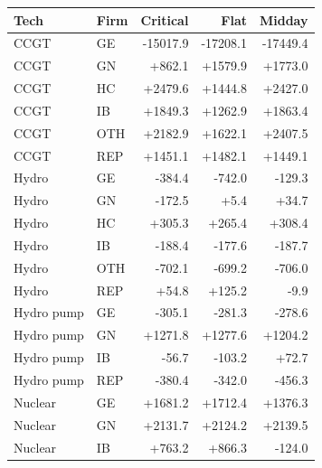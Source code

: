 \begin{tabular}{l l r r r}
\toprule
Tech & Firm & Critical & Flat & Midday \\
\midrule
CCGT & GE & -15017.9 & -17208.1 & -17449.4 \\
CCGT & GN & +862.1 & +1579.9 & +1773.0 \\
CCGT & HC & +2479.6 & +1444.8 & +2427.0 \\
CCGT & IB & +1849.3 & +1262.9 & +1863.4 \\
CCGT & OTH & +2182.9 & +1622.1 & +2407.5 \\
CCGT & REP & +1451.1 & +1482.1 & +1449.1 \\
Hydro & GE & -384.4 & -742.0 & -129.3 \\
Hydro & GN & -172.5 & +5.4 & +34.7 \\
Hydro & HC & +305.3 & +265.4 & +308.4 \\
Hydro & IB & -188.4 & -177.6 & -187.7 \\
Hydro & OTH & -702.1 & -699.2 & -706.0 \\
Hydro & REP & +54.8 & +125.2 & -9.9 \\
Hydro pump & GE & -305.1 & -281.3 & -278.6 \\
Hydro pump & GN & +1271.8 & +1277.6 & +1204.2 \\
Hydro pump & IB & -56.7 & -103.2 & +72.7 \\
Hydro pump & REP & -380.4 & -342.0 & -456.3 \\
Nuclear & GE & +1681.2 & +1712.4 & +1376.3 \\
Nuclear & GN & +2131.7 & +2124.2 & +2139.5 \\
Nuclear & IB & +763.2 & +866.3 & -124.0 \\
\bottomrule
\end{tabular}